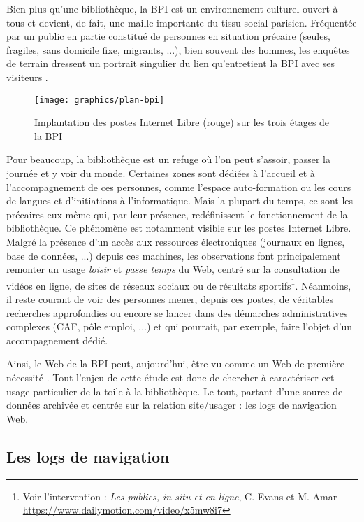 \documentclass[symmetric,justified,marginals=raggedouter]{tufte-book}
\begin{document}
Bien plus qu'une bibliothèque, la BPI est un environnement culturel ouvert à tous et devient, de fait, une maille importante du tissu social parisien. Fréquentée par un public en partie constitué de personnes en situation précaire (seules, fragiles, sans domicile fixe, migrants, ...), bien souvent des hommes, les enquêtes de terrain dressent un portrait singulier du lien qu'entretient la BPI avec ses visiteurs \citep{paugam_pauvres_2013}. 

\begin{figure*}
  \texttt{[image: graphics/plan-bpi]}
  \caption{Implantation des postes Internet Libre (rouge) sur les trois étages de la BPI}
  \label{fig:plan-bpi}
\end{figure*}

\noindent Pour beaucoup, la bibliothèque est un refuge où l'on peut s'assoir, passer la journée et y voir du monde. Certaines zones sont dédiées à l'accueil et à l'accompagnement de ces personnes, comme l'espace auto-formation ou les cours de langues et d'initiations à l'informatique. Mais la plupart du temps, ce sont les précaires eux même qui, par leur présence, redéfinissent le fonctionnement de la bibliothèque. Ce phénomène est notamment visible sur les postes Internet Libre. Malgré la présence d'un accès aux ressources électroniques (journaux en lignes, base de données, ...) depuis ces machines, les observations font principalement remonter un usage \textit{loisir} et \textit{passe temps} du Web, centré sur la consultation de vidéos en ligne, de sites de réseaux sociaux ou de résultats sportifs\footnote{Voir l'intervention : \textit{Les publics, in situ et en ligne}, C. Evans et M. Amar  \url{https://www.dailymotion.com/video/x5mw8i7}}. Néanmoins, il reste courant de voir des personnes mener, depuis ces postes, de véritables recherches approfondies ou encore se lancer dans des démarches administratives complexes (CAF, pôle emploi, ...) et qui pourrait, par exemple, faire l'objet d'un accompagnement dédié. 

Ainsi, le Web de la BPI peut, aujourd'hui, être vu comme un Web de première nécessité \citep{pasquier_classes_2018}. Tout l'enjeu de cette étude est donc de chercher à caractériser cet usage particulier de la toile à la bibliothèque. Le tout, partant d'une source de données archivée et centrée sur la relation site/usager : les logs de navigation Web. 

\subsection{Les logs de navigation}
\end{document}

